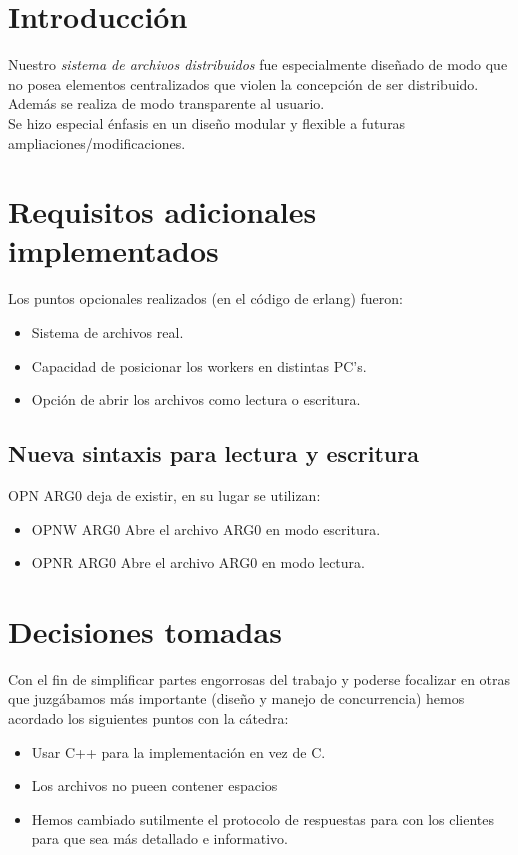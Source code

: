 \documentclass[12pt]{article}
\begin{document}
\section{Introducción}
Nuestro \textit{sistema de archivos distribuidos} fue especialmente diseñado de modo que no posea elementos centralizados que violen la concepción de ser distribuido. Además se realiza de modo transparente al usuario.\\
Se hizo especial énfasis en un diseño modular y flexible a futuras ampliaciones/modificaciones.\\

\section{Requisitos adicionales implementados}
Los puntos opcionales realizados (en el código de erlang)  fueron:
\begin{itemize}
\item Sistema de archivos real.
\item Capacidad de posicionar los workers en distintas PC's.
\item Opción de abrir los archivos como lectura o escritura.
\end{itemize}

\subsection{Nueva sintaxis para lectura y escritura}
OPN ARG0  deja de existir, en su lugar se utilizan:
\begin{itemize}
\item OPNW ARG0 Abre el archivo ARG0 en modo escritura.
\item OPNR ARG0 Abre el archivo ARG0 en modo lectura.
\end{itemize}

\section{Decisiones tomadas}
Con el fin de simplificar partes engorrosas del trabajo y poderse focalizar en otras que juzgábamos más importante (diseño y manejo de concurrencia) hemos acordado los siguientes puntos con la cátedra:
\begin{itemize}
\item Usar C++ para la implementación en vez de C.
\item Los archivos no pueen contener espacios
\item Hemos cambiado sutilmente el protocolo de respuestas para con los clientes para que sea más detallado e informativo.
\end{itemize}
\end{document}
